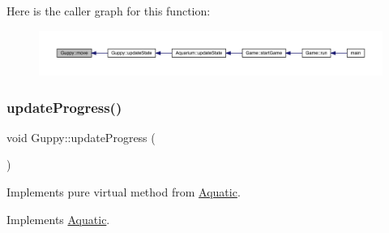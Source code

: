 Here is the caller graph for this function\+:\nopagebreak
\begin{figure}[H]
\begin{center}
\leavevmode
\includegraphics[width=350pt]{class_guppy_ae6002948d74b3741bed34a7311be4377_icgraph}
\end{center}
\end{figure}
\mbox{\label{class_guppy_af22eacc4a1ea7bec4be7b5d82148407b}} 
\subsubsection{\texorpdfstring{update\+Progress()}{updateProgress()}}
{\footnotesize\ttfamily void Guppy\+::update\+Progress (\begin{DoxyParamCaption}{ }\end{DoxyParamCaption})\hspace{0.3cm}{\ttfamily [virtual]}}



Implements pure virtual method from \mbox{\hyperlink{class_aquatic}{Aquatic}}. 



Implements \mbox{\hyperlink{class_aquatic_ae1b6301ed27d6aadb73c7ee7879c24af}{Aquatic}}.

